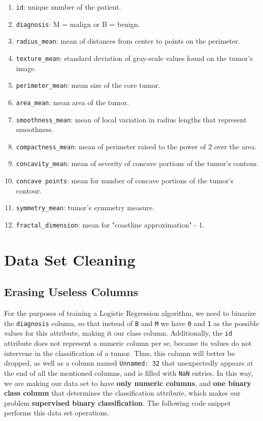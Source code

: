 \documentclass[11pt]{article}
\begin{document}
\begin{tcolorbox}
\begin{enumerate}[nolistsep]
    \item \verb$id$: unique number of the patient.
    \item \verb$diagnosis$: M = malign or B = benign.
    \item \verb$radius_mean$: mean of distances from center to points on the perimeter.
    \item \verb$texture_mean$: standard deviation of gray-scale values found on the tumor's image.
    \item \verb$perimeter_mean$: mean size of the core tumor.
    \item \verb$area_mean$: mean area of the tumor.
    \item \verb$smoothness_mean$: mean of local variation in radius lengths that represent smoothness.
    \item \verb$compactness_mean$: mean of perimeter raised to the power of 2 over the area.
    \item \verb$concavity_mean$: mean of severity of concave portions of the tumor's contour.
    \item \verb$concave points$: mean for number of concave portions of the tumor's contour.
    \item \verb$symmetry_mean$: tumor's symmetry measure.
    \item \verb$fractal_dimension$: mean for "coastline approximation" - 1.
\end{enumerate}
\end{tcolorbox}

\section{Data Set Cleaning}

\subsection{Erasing Useless Columns}

For the purposes of training a Logistic Regression algorithm, we need to binarize the \verb$diagnosis$ column, so that instead of \verb$B$ and \verb$M$ we have \verb$0$ and \verb$1$ as the possible values for this attribute, making it our class column. Additionally, the \verb$id$ attribute does not represent a numeric column per se, because its values do not intervene in the classification of a tumor. Thus, this column will better be dropped, as well as a column named \verb$Unnamed: 32$ that unexpectedly appears at the end of all the mentioned columns, and is filled with \verb$NaN$ entries. In this way, we are making our data set to have \textbf{only numeric columns}, and \textbf{one binary class column} that determines the classification attribute, which makes our problem \textbf{supervised binary classification}. The following code snippet performs this data set operations.
\\
\end{document}
